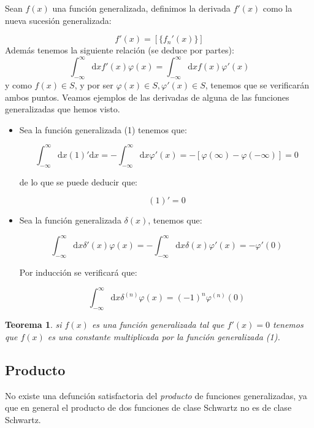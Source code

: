 \documentclass[12pt,a4paper]{book}
\newcommand{\D}{\mathrm{d}}
\newcommand{\inti}{\int_{-\infty}^{\infty}}
\newtheorem{theorem}{Teorema}[section]
\begin{document}
Sean $f(x)$ una función generalizada, definimos la derivada $f ' (x)$ como la nueva sucesión generalizada:

\begin{equation}
f '(x) = [ \{ f_n ' (x) \} ]
\end{equation}
Además tenemos la siguiente relación (se deduce por partes):
\begin{equation} \inti \D x f '(x) \varphi (x) = \inti \D x f(x) \varphi '(x) 
\end{equation}
y como $f(x) \in S$, y por ser $\varphi (x) \in S, \varphi' (x) \in S$, tenemos que se verificarán ambos puntos. Veamos ejemplos de las derivadas de alguna de las funciones generalizadas que hemos visto.

\begin{itemize}
\item Sea la función generalizada (1) tenemos que:

$$ \inti \D x (1)' \D x = - \inti \D x \varphi'(x) = - [\varphi(\infty) - \varphi (-\infty)] = 0  $$

de lo que se puede deducir que:

\begin{equation}
(1)' = 0
\end{equation}

\item Sea la función generalizada $\delta (x)$, tenemos que:

$$ \inti \D x \delta ' (x) \varphi (x) = - \inti \D x \delta (x) \varphi ' (x) = - \varphi ' (0) $$

Por inducción se verificará que:

\begin{equation}
\inti \D x \delta^{(n)} \varphi (x) = (-1)^n \varphi^{(n)} (0)
\end{equation}

\end{itemize}

\begin{theorem}
si $f(x)$ es una función generalizada tal que $f'(x)= 0$ tenemos que $f(x)$ es una constante multiplicada por la función generalizada (1).
\end{theorem}

\subsection{Producto}

No existe una defunción satisfactoria del \textit{producto} de funciones generalizadas, ya que en general el producto de dos funciones de clase Schwartz no es de clase Schwartz. 
\end{document}
